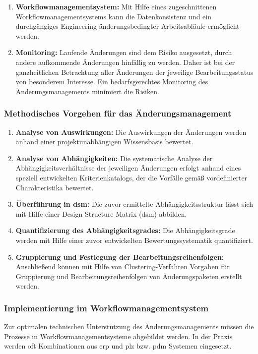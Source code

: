 \begin{enumerate}
 \item \textbf{Workflowmanagementsystem: }
 Mit Hilfe eines zugeschnittenen Workflowmanagementsystems kann die Datenkonsistenz und ein durchgängiges Engineering änderungsbedingter Arbeitsabläufe ermöglicht werden. 
 \item \textbf{Monitoring: }
 Laufende Änderungen sind dem Risiko ausgesetzt, durch andere aufkommende Änderungen hinfällig zu werden. Daher ist bei der ganzheitlichen Betrachtung aller Änderungen der jeweilige Bearbeitungsstatus von besonderem Interesse. Ein bedarfsgerechtes Monitoring des Änderungsmanagements minimiert die Risiken. 
\end{enumerate}

\subsubsection*{Methodisches Vorgehen für das Änderungsmanagement}

\begin{enumerate}
 \item \textbf{Analyse von Auswirkungen: }
 Die Auswirkungen der Änderungen werden anhand einer projektunabhängigen Wissensbasis bewertet. 
 \item \textbf{Analyse von Abhängigkeiten: }
Die systematische Analyse der Abhängigkeitsverhältnisse der jeweiligen Änderungen erfolgt anhand eines speziell entwickelten Kriterienkatalogs, der die Vorfälle gemäß vordefinierter Charakteristika bewertet. 
\item \textbf{Überführung in \gls{dsm}: }
Die zuvor ermittelte Abhängigkeitsstruktur lässt sich mit Hilfe einer Design Structure Matrix (\gls{dsm}) abbilden. 
 \item \textbf{Quantifizierung des Abhängigkeitsgrades: }
 Die Abhängigkeitsgrade werden mit Hilfe einer zuvor entwickelten Bewertungssystematik quantifiziert.
 \item \textbf{Gruppierung und Festlegung der Bearbeitungsreihenfolgen: }
 Anschließend können mit Hilfe von Clustering-Verfahren Vorgaben für Gruppierung und Bearbeitungsreihenfolgen von Änderungspaketen erstellt werden. 
\end{enumerate}

\subsubsection*{Implementierung im Workflowmanagementsystem}
Zur optimalen technischen Unterstützung des Änderungsmanagements müssen die Prozesse in Workflowmanagementsysteme abgebildet werden. In der Praxis werden oft Kombinationen aus \gls{erp} und \gls{plz} bzw. \gls{pdm} Systemen eingesetzt. 

